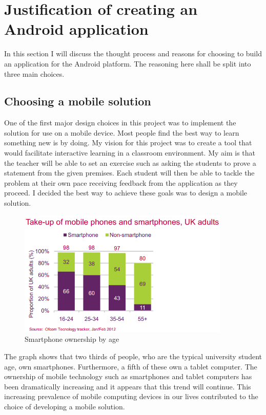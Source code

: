 \section{Justification of creating an Android application}

In this section I will discuss the thought process and reasons for choosing to build an application for the Android platform. The reasoning here shall be split into three main choices.

\subsection{Choosing a mobile solution}

One of the first major design choices in this project was to implement the solution for use on a mobile device.  Most people find the best way to learn something new is by doing. My vision for this project was to create a tool that would facilitate interactive learning in a classroom environment. My aim is that the teacher will be able to set an exercise such as asking the students to prove a statement from the given premises. Each student will then be able to tackle the problem at their own pace receiving feedback from the application as they proceed. I decided the best way to achieve these goals was to design a mobile solution.


\begin{figure}[h]
\centering
\includegraphics[width=0.9\textwidth]{Images/smartphones.png}
\caption{Smartphone ownership by age}
\label{fig:smartphone_barchart}
\end{figure}

The graph shows that two thirds of people, who are the typical university student age, own smartphones. Furthermore, a fifth of these own a tablet computer. \cite{ofcom} The ownership of mobile technology such as smartphones and tablet computers has been dramatically increasing and it appears that this trend will continue. 
This increasing prevalence of mobile computing devices in our lives contributed to the choice of developing a mobile solution.

